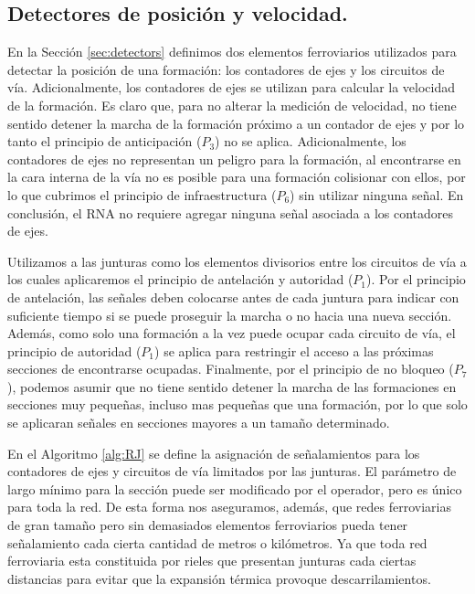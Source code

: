 \subsection{Detectores de posición y velocidad.}

    
    En la Sección \ref{sec:detectors} definimos dos elementos ferroviarios utilizados para detectar la posición de una formación: los contadores de ejes y los circuitos de vía. Adicionalmente, los contadores de ejes se utilizan para calcular la velocidad de la formación. Es claro que, para no alterar la medición de velocidad, no tiene sentido detener la marcha de la formación próximo a un contador de ejes y por lo tanto el principio de anticipación ($P_3$) no se aplica. Adicionalmente, los contadores de ejes no representan un peligro para la formación, al encontrarse en la cara interna de la vía no es posible para una formación colisionar con ellos, por lo que cubrimos el principio de infraestructura ($P_6$) sin utilizar ninguna señal. En conclusión, el RNA no requiere agregar ninguna señal asociada a los contadores de ejes.

    Utilizamos a las junturas como los elementos divisorios entre los circuitos de vía a los cuales aplicaremos el principio de antelación y autoridad ($P_1$). Por el principio de antelación, las señales deben colocarse antes de cada juntura para indicar con suficiente tiempo si se puede proseguir la marcha o no hacia una nueva sección. Además, como solo una formación a la vez puede ocupar cada circuito de vía, el principio de autoridad ($P_1$) se aplica para restringir el acceso a las próximas secciones de encontrarse ocupadas. Finalmente, por el principio de no bloqueo ($P_7$), podemos asumir que no tiene sentido detener la marcha de las formaciones en secciones muy pequeñas, incluso mas pequeñas que una formación, por lo que solo se aplicaran señales en secciones mayores a un tamaño determinado.
    
    En el Algoritmo \ref{alg:RJ} se define la asignación de señalamientos para los contadores de ejes y circuitos de vía limitados por las junturas. El parámetro de largo mínimo para la sección puede ser modificado por el operador, pero es único para toda la red. De esta forma nos aseguramos, además, que redes ferroviarias de gran tamaño pero sin demasiados elementos ferroviarios pueda tener señalamiento cada cierta cantidad de metros o kilómetros. Ya que toda red ferroviaria esta constituida por rieles que presentan junturas cada ciertas distancias para evitar que la expansión térmica provoque descarrilamientos.

